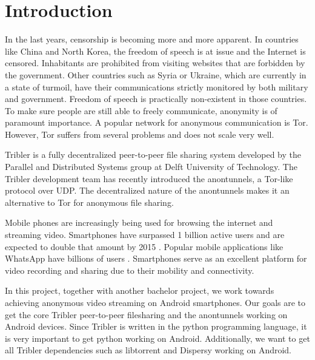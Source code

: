 



\chapter{Introduction}

In the last years, censorship is becoming more and more apparent. In countries like China and North Korea, the freedom of speech is at issue and the Internet is censored. Inhabitants are prohibited from visiting websites that are forbidden by the government. Other countries such as Syria or Ukraine, which are currently in a state of turmoil, have their communications strictly monitored by both military and government. Freedom of speech is practically non-existent in those countries. To make sure people are still able to freely communicate, anonymity is of paramount importance. A popular network for anonymous communication is Tor. However, Tor suffers from several problems and does not scale very well.

Tribler is a fully decentralized peer-to-peer file sharing system developed by the Parallel and Distributed Systems group at Delft University of Technology. The Tribler development team has recently introduced the anontunnels, a Tor-like protocol over UDP. The decentralized nature of the anontunnels makes it an alternative to Tor for anonymous file sharing.

Mobile phones are increasingly being used for browsing the internet and streaming video. Smartphones have surpassed 1 billion active users and are expected to double that amount by 2015 \cite{yang2015smartphones}. Popular mobile applications like WhatsApp have billions of users \cite{googleplayinstagram, googleplaywhatsapp}. Smartphones serve as an excellent platform for video recording and sharing due to their mobility and connectivity.

In this project, together with another bachelor project, we work towards achieving anonymous video streaming on Android smartphones. Our goals are to get the core Tribler peer-to-peer filesharing and the anontunnels working on Android devices. Since Tribler is written in the python programming language, it is very important to get python working on Android. Additionally, we want to get all Tribler dependencies such as libtorrent and Dispersy working on Android.